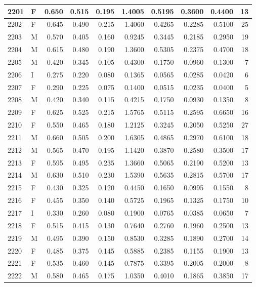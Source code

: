 \documentclass[9pt,twocolumn,twoside,]{pnas-new}
\begin{document}
\begin{tabular}{l|l|r|r|r|r|r|r|r|r}
\hline
2201 & F & 0.650 & 0.515 & 0.195 & 1.4005 & 0.5195 & 0.3600 & 0.4400 & 13\\
\hline
2202 & F & 0.645 & 0.490 & 0.215 & 1.4060 & 0.4265 & 0.2285 & 0.5100 & 25\\
\hline
2203 & M & 0.570 & 0.405 & 0.160 & 0.9245 & 0.3445 & 0.2185 & 0.2950 & 19\\
\hline
2204 & M & 0.615 & 0.480 & 0.190 & 1.3600 & 0.5305 & 0.2375 & 0.4700 & 18\\
\hline
2205 & M & 0.420 & 0.345 & 0.105 & 0.4300 & 0.1750 & 0.0960 & 0.1300 & 7\\
\hline
2206 & I & 0.275 & 0.220 & 0.080 & 0.1365 & 0.0565 & 0.0285 & 0.0420 & 6\\
\hline
2207 & F & 0.290 & 0.225 & 0.075 & 0.1400 & 0.0515 & 0.0235 & 0.0400 & 5\\
\hline
2208 & M & 0.420 & 0.340 & 0.115 & 0.4215 & 0.1750 & 0.0930 & 0.1350 & 8\\
\hline
2209 & F & 0.625 & 0.525 & 0.215 & 1.5765 & 0.5115 & 0.2595 & 0.6650 & 16\\
\hline
2210 & F & 0.550 & 0.465 & 0.180 & 1.2125 & 0.3245 & 0.2050 & 0.5250 & 27\\
\hline
2211 & M & 0.660 & 0.505 & 0.200 & 1.6305 & 0.4865 & 0.2970 & 0.6100 & 18\\
\hline
2212 & M & 0.565 & 0.470 & 0.195 & 1.1420 & 0.3870 & 0.2580 & 0.3500 & 17\\
\hline
2213 & F & 0.595 & 0.495 & 0.235 & 1.3660 & 0.5065 & 0.2190 & 0.5200 & 13\\
\hline
2214 & M & 0.630 & 0.510 & 0.230 & 1.5390 & 0.5635 & 0.2815 & 0.5700 & 17\\
\hline
2215 & F & 0.430 & 0.325 & 0.120 & 0.4450 & 0.1650 & 0.0995 & 0.1550 & 8\\
\hline
2216 & F & 0.455 & 0.350 & 0.140 & 0.5725 & 0.1965 & 0.1325 & 0.1750 & 10\\
\hline
2217 & I & 0.330 & 0.260 & 0.080 & 0.1900 & 0.0765 & 0.0385 & 0.0650 & 7\\
\hline
2218 & F & 0.515 & 0.415 & 0.130 & 0.7640 & 0.2760 & 0.1960 & 0.2500 & 13\\
\hline
2219 & M & 0.495 & 0.390 & 0.150 & 0.8530 & 0.3285 & 0.1890 & 0.2700 & 14\\
\hline
2220 & F & 0.485 & 0.375 & 0.145 & 0.5885 & 0.2385 & 0.1155 & 0.1900 & 13\\
\hline
2221 & F & 0.535 & 0.460 & 0.145 & 0.7875 & 0.3395 & 0.2005 & 0.2000 & 8\\
\hline
2222 & M & 0.580 & 0.465 & 0.175 & 1.0350 & 0.4010 & 0.1865 & 0.3850 & 17\\

\end{tabular}
\end{document}
